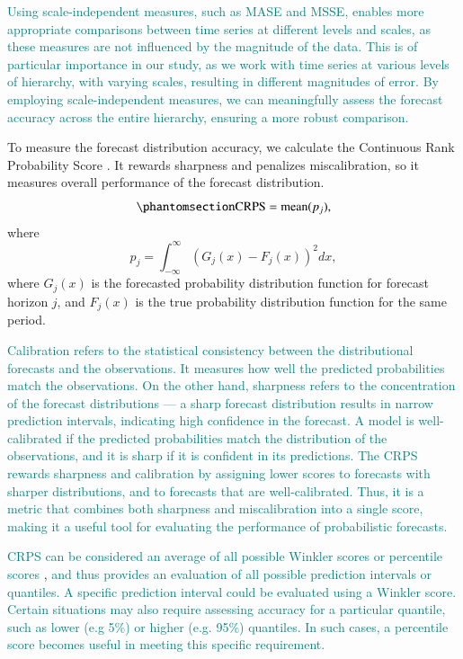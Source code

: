 \documentclass[
  authoryear,
  preprint,
  3p]{elsarticle}
\begin{document}
\textcolor{teal}{Using scale-independent measures, such as MASE and MSSE, enables more appropriate comparisons between time series at different levels and scales, as these measures are not influenced by the magnitude of the data. This is of particular importance in our study, as we work with time series at various levels of hierarchy, with varying scales, resulting in different magnitudes of error. By employing scale-independent measures, we can meaningfully assess the forecast accuracy across the entire hierarchy, ensuring a more robust comparison.}

To measure the forecast distribution accuracy, we calculate the
Continuous Rank Probability Score
\citep{gneiting2014probabilistic, hyndman2021forecasting}. It rewards
sharpness and penalizes miscalibration, so it measures overall
performance of the forecast distribution.
\begin{equation}\phantomsection\label{eq-CRPS}{
  \text{CRPS} = \text{mean}(p_j),
}\end{equation} where \[
  p_j = \int_{-\infty}^{\infty} \left(G_j(x) - F_j(x)\right)^2dx,
\] where \(G_j(x)\) is the forecasted probability distribution function
for forecast horizon \(j\), and \(F_j(x)\) is the true probability
distribution function for the same period.

\textcolor{teal}{Calibration refers to the statistical consistency between the distributional forecasts and the observations. It measures how well the predicted probabilities match the observations. On the other hand, sharpness refers to the concentration of the forecast distributions --- a sharp forecast distribution results in narrow prediction intervals, indicating high confidence in the forecast. A model is well-calibrated if the predicted probabilities match the distribution of the observations, and it is sharp if it is confident in its predictions. The CRPS rewards sharpness and calibration by assigning lower scores to forecasts with sharper distributions, and to forecasts that are well-calibrated. Thus, it is a metric that combines both sharpness and miscalibration into a single score, making it a useful tool for evaluating the performance of probabilistic forecasts.}

\textcolor{teal}{CRPS can be considered an average of all possible Winkler scores}
\citep[Section 5.9]{winkler1972decision, hyndman2021forecasting}
\textcolor{teal}{or percentile scores} \citep[Section
5.9]{hyndman2021forecasting},
\textcolor{teal}{and thus provides an evaluation of all possible prediction intervals or quantiles.}
\textcolor{teal}{A specific prediction interval could be evaluated using a Winkler score. Certain situations may also require assessing accuracy for a particular quantile, such as lower (e.g 5\%) or higher (e.g. 95\%) quantiles. In such cases, a percentile score becomes useful in meeting this specific requirement.}
\end{document}

